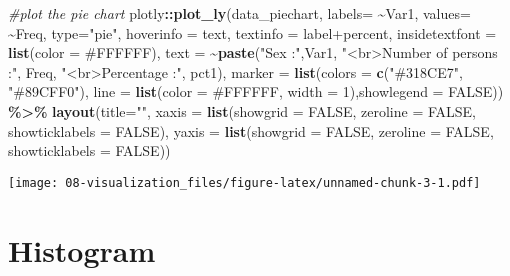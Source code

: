 \documentclass[
]{book}
\newenvironment{Shaded}{\begin{snugshade}}{\end{snugshade}}
\newcommand{\AttributeTok}[1]{\textcolor[rgb]{0.13,0.29,0.53}{#1}}
\newcommand{\CommentTok}[1]{\textcolor[rgb]{0.56,0.35,0.01}{\textit{#1}}}
\newcommand{\ConstantTok}[1]{\textcolor[rgb]{0.56,0.35,0.01}{#1}}
\newcommand{\DecValTok}[1]{\textcolor[rgb]{0.00,0.00,0.81}{#1}}
\newcommand{\FunctionTok}[1]{\textcolor[rgb]{0.13,0.29,0.53}{\textbf{#1}}}
\newcommand{\NormalTok}[1]{#1}
\newcommand{\SpecialCharTok}[1]{\textcolor[rgb]{0.81,0.36,0.00}{\textbf{#1}}}
\newcommand{\StringTok}[1]{\textcolor[rgb]{0.31,0.60,0.02}{#1}}
\begin{document}
\begin{Shaded}
\begin{Highlighting}[]
\CommentTok{\#plot the pie chart}
\NormalTok{plotly}\SpecialCharTok{::}\FunctionTok{plot\_ly}\NormalTok{(data\_piechart, }\AttributeTok{labels=} \SpecialCharTok{\textasciitilde{}}\NormalTok{Var1,}
          \AttributeTok{values=} \SpecialCharTok{\textasciitilde{}}\NormalTok{Freq, }\AttributeTok{type=}\StringTok{"pie"}\NormalTok{,}
          \AttributeTok{hoverinfo =} \StringTok{\textquotesingle{}text\textquotesingle{}}\NormalTok{,}
          \AttributeTok{textinfo =} \StringTok{\textquotesingle{}label+percent\textquotesingle{}}\NormalTok{,}
          \AttributeTok{insidetextfont =} \FunctionTok{list}\NormalTok{(}\AttributeTok{color =} \StringTok{\textquotesingle{}\#FFFFFF\textquotesingle{}}\NormalTok{),}
          \AttributeTok{text =} \SpecialCharTok{\textasciitilde{}}\FunctionTok{paste}\NormalTok{(}\StringTok{"Sex :"}\NormalTok{,Var1,}
                        \StringTok{"\textless{}br\textgreater{}Number of persons :"}\NormalTok{, Freq,}
                        \StringTok{"\textless{}br\textgreater{}Percentage :"}\NormalTok{, pct1),}
          \AttributeTok{marker =} \FunctionTok{list}\NormalTok{(}\AttributeTok{colors =} \FunctionTok{c}\NormalTok{(}\StringTok{"\#318CE7"}\NormalTok{, }\StringTok{"\#89CFF0"}\NormalTok{),}
                        \AttributeTok{line =} \FunctionTok{list}\NormalTok{(}\AttributeTok{color =} \StringTok{\textquotesingle{}\#FFFFFF\textquotesingle{}}\NormalTok{, }\AttributeTok{width =} \DecValTok{1}\NormalTok{),}\AttributeTok{showlegend =} \ConstantTok{FALSE}\NormalTok{)) }\SpecialCharTok{\%\textgreater{}\%}
    \FunctionTok{layout}\NormalTok{(}\AttributeTok{title=}\StringTok{""}\NormalTok{,}
           \AttributeTok{xaxis =} \FunctionTok{list}\NormalTok{(}\AttributeTok{showgrid =} \ConstantTok{FALSE}\NormalTok{, }\AttributeTok{zeroline =} \ConstantTok{FALSE}\NormalTok{, }\AttributeTok{showticklabels =} \ConstantTok{FALSE}\NormalTok{),}
           \AttributeTok{yaxis =} \FunctionTok{list}\NormalTok{(}\AttributeTok{showgrid =} \ConstantTok{FALSE}\NormalTok{, }\AttributeTok{zeroline =} \ConstantTok{FALSE}\NormalTok{, }\AttributeTok{showticklabels =} \ConstantTok{FALSE}\NormalTok{))}
\end{Highlighting}
\end{Shaded}

\texttt{[image: 08-visualization\_files/figure-latex/unnamed-chunk-3-1.pdf]}

\hypertarget{histogram}{%
\section{Histogram}\label{histogram}}
\end{document}
